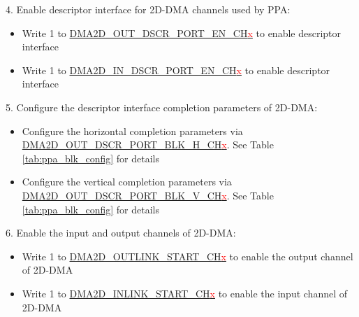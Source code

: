 \documentclass[main\_\_EN.tex]{subfiles}
\begin{document}
4. Enable descriptor interface for 2D-DMA channels used by PPA:
\begin{itemize}
    \item Write 1 to \hyperref[fielddesc:DMA2DOUTDSCRPORTENCHN]{DMA2D\_OUT\_DSCR\_PORT\_EN\_CH\textcolor{red}{x}}  to enable descriptor interface
    \item Write 1 to \hyperref[fielddesc:DMA2DINDSCRPORTENCHN]{DMA2D\_IN\_DSCR\_PORT\_EN\_CH\textcolor{red}{x}}  to enable descriptor interface
\end{itemize}

5. Configure the descriptor interface completion parameters of 2D-DMA:
\begin{itemize}
    \item Configure the horizontal completion parameters via \hyperref[fielddesc:DMA2DOUTDSCRPORTBLKHCHN]{DMA2D\_OUT\_DSCR\_PORT\_BLK\_H\_CH\textcolor{red}{x}}. See Table \ref{tab:ppa_blk_config} for details
    \item Configure the vertical completion parameters via \hyperref[fielddesc:DMA2DOUTDSCRPORTBLKVCHN]{DMA2D\_OUT\_DSCR\_PORT\_BLK\_V\_CH\textcolor{red}{x}}. See Table \ref{tab:ppa_blk_config} for details
\end{itemize}

6. Enable the input and output channels of 2D-DMA:
\begin{itemize}
    \item Write 1 to \hyperref[fielddesc:DMA2DOUTLINKSTARTCHN]{DMA2D\_OUTLINK\_START\_CH\textcolor{red}{x}} to enable the output channel of 2D-DMA
    \item Write 1 to \hyperref[fielddesc:DMA2DINLINKSTARTCHN]{DMA2D\_INLINK\_START\_CH\textcolor{red}{x}} to enable the input channel of 2D-DMA
\end{itemize}
\end{document}
